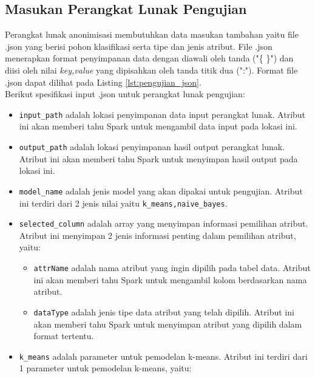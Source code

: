\subsection{Masukan Perangkat Lunak Pengujian}
Perangkat lunak anonimisasi membutuhkan data masukan tambahan yaitu file .json yang berisi pohon klasifikasi serta tipe dan jenis atribut. File .json menerapkan format penyimpanan data dengan diawali oleh tanda ("\{ \}") dan diisi oleh nilai \textit{key,value} yang dipisahkan oleh tanda titik dua (":"). Format file .json dapat dilihat pada Listing \ref{lst:pengujian_json}.\\

\noindent Berikut spesifikasi input .json untuk perangkat lunak pengujian:

\begin{itemize}

\item \texttt{input\_path} adalah lokasi penyimpanan data input perangkat lunak. Atribut ini akan memberi tahu Spark untuk mengambil data input pada lokasi ini.

\item \texttt{output\_path} adalah lokasi penyimpanan hasil output perangkat lunak. Atribut ini akan memberi tahu Spark untuk menyimpan hasil output pada lokasi ini.

\item \texttt{model\_name} adalah jenis model yang akan dipakai untuk pengujian. Atribut ini terdiri dari 2 jenis nilai yaitu \texttt{k\_means,naive\_bayes}.

\item \texttt{selected\_column} adalah array yang menyimpan informasi pemilihan atribut. Atribut ini menyimpan 2 jenis informasi penting dalam pemilihan atribut, yaitu:

\begin{itemize}

\item \texttt{attrName} adalah nama atribut yang ingin dipilih pada tabel data. Atribut ini akan memberi tahu Spark untuk mengambil kolom berdasarkan nama atribut.

\item \texttt{dataType} adalah jenis tipe data atribut yang telah dipilih. Atribut ini akan memberi tahu Spark untuk menyimpan atribut yang dipilih dalam format tertentu.

\end{itemize}

\item \texttt{k\_means} adalah parameter untuk pemodelan k-means. Atribut ini terdiri dari 1 parameter untuk pemodelan k-means, yaitu:


\end{itemize}
